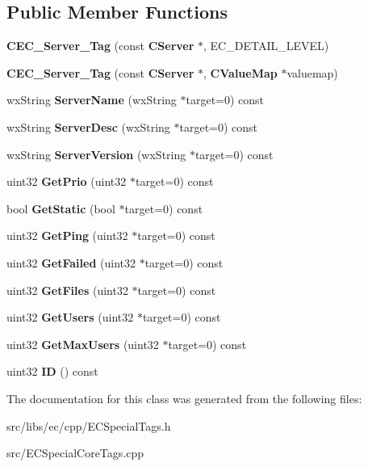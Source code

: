 \subsection*{Public Member Functions}
\begin{DoxyCompactItemize}
\item 
{\bfseries CEC\_\-Server\_\-Tag} (const {\bf CServer} $\ast$, EC\_\-DETAIL\_\-LEVEL)\label{classCEC__Server__Tag_a2b892f141f7df48e6958faaf8177dcef}

\item 
{\bfseries CEC\_\-Server\_\-Tag} (const {\bf CServer} $\ast$, {\bf CValueMap} $\ast$valuemap)\label{classCEC__Server__Tag_aef03b1e003be1de798d1a4a020e7990b}

\item 
wxString {\bfseries ServerName} (wxString $\ast$target=0) const \label{classCEC__Server__Tag_af17d429bb2c5ffeade0e37ddc639f4e2}

\item 
wxString {\bfseries ServerDesc} (wxString $\ast$target=0) const \label{classCEC__Server__Tag_a75db1fc40d377f78f3ced593ba46c682}

\item 
wxString {\bfseries ServerVersion} (wxString $\ast$target=0) const \label{classCEC__Server__Tag_abc4d47b8ccf3d5b69a61c52949580c06}

\item 
uint32 {\bfseries GetPrio} (uint32 $\ast$target=0) const \label{classCEC__Server__Tag_ad7fdd21c3a42005376c0f10a9211b8a4}

\item 
bool {\bfseries GetStatic} (bool $\ast$target=0) const \label{classCEC__Server__Tag_a53575fd6a56bea0284e2f6e3e27bd402}

\item 
uint32 {\bfseries GetPing} (uint32 $\ast$target=0) const \label{classCEC__Server__Tag_acf3648718f7a683afd4c7fa7bda8580e}

\item 
uint32 {\bfseries GetFailed} (uint32 $\ast$target=0) const \label{classCEC__Server__Tag_a7891d38514a8d707c39bf49ab1151203}

\item 
uint32 {\bfseries GetFiles} (uint32 $\ast$target=0) const \label{classCEC__Server__Tag_af7c24ba8d0cf3ddfb7a18943ff465cfc}

\item 
uint32 {\bfseries GetUsers} (uint32 $\ast$target=0) const \label{classCEC__Server__Tag_a2bb5f656561d6daaa08cb883b5e6c4a9}

\item 
uint32 {\bfseries GetMaxUsers} (uint32 $\ast$target=0) const \label{classCEC__Server__Tag_a13b5d7f36abe7e9267f11d12011ae4f2}

\item 
uint32 {\bfseries ID} () const \label{classCEC__Server__Tag_a5cf6303a2dc773d7e08f67adda82a5f0}

\end{DoxyCompactItemize}


The documentation for this class was generated from the following files:\begin{DoxyCompactItemize}
\item 
src/libs/ec/cpp/ECSpecialTags.h\item 
src/ECSpecialCoreTags.cpp\end{DoxyCompactItemize}
